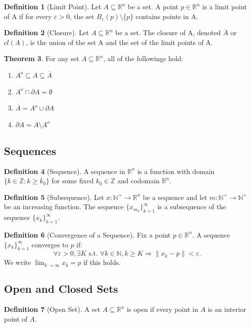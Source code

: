 \documentclass[12pt]{article}
\theoremstyle{definition}
\newtheorem{definition}{Definition}[subsection]
\newtheorem{theorem}[definition]{Theorem}
\theoremstyle{remark}
\begin{document}
\begin{definition}[Limit Point]
Let $A\subseteq\mathbb{R}^n$ be a set. A point $p\in\mathbb{R}^n$ is a limit point of A if for every $\varepsilon > 0$, the set $B_\varepsilon(p) \setminus \{p\}$ contains points in A.
\end{definition}
\begin{definition}[Closure]
Let $A\subseteq\mathbb{R}^n$ be a set. The closure of A, denoted $\overline A$ or $cl(A)$, is the union of the set A and the set of the limit points of A.
\end{definition}
\begin{theorem}
For any set $A\subseteq\mathbb{R}^n$, all of the followings hold:
\begin{enumerate}[label=(\alph*), nosep]
\item $A^o \subseteq A\subseteq \overline A$
\item $A^o\cap \partial A=\emptyset$
\item $\overline A=A^o\cup \partial A$
\item $\partial A=\overline A \setminus A^o$
\end{enumerate}
\end{theorem}

\subsection{Sequences}
\begin{definition}[Sequence]
A sequence in $\mathbb{R}^n$ is a function with domain $\{k\in\mathbb{Z}:k\geq k_0\}$ for some fixed $k_0\in\mathbb{Z}$ and codomain $\mathbb{R}^n$.
\end{definition}
\begin{definition}[Subsequence]
Let $x:\mathbb{N}^+\to\mathbb{R}^n$ be a sequence and let $m:\mathbb{N}^+\to\mathbb{N}^+$ be an increasing function. The sequence $\{x_{m_k}\}_{k=1}^\infty$ is a subsequence of the sequence $\{x_k\}_{k=1}^\infty$.
\end{definition}

\begin{definition}[Convergence of a Sequence]
Fix a point $p\in\mathbb{R}^n$. A sequence $\{x_k\}_{k=1}^\infty$ converges to $p$ if:
\[
\forall \varepsilon>0, \exists K \text{ s.t. } \forall k\in\mathbb{N}, k\ge K\Rightarrow \|x_k-p\|<\varepsilon.
\]
We write $\displaystyle \lim_{k\to\infty}x_k=p$ if this holds.
\end{definition}

\subsection{Open and Closed Sets}
\begin{definition}[Open Set]
A set $A\subseteq\mathbb{R}^n$ is open if every point in $A$ is an interior point of $A$.
\end{definition}
\end{document}
